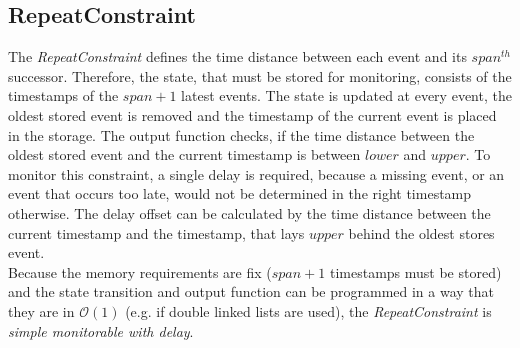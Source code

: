 \subsection{RepeatConstraint}
	The \emph{RepeatConstraint} defines the time distance between each event and its $span^{th}$ successor. Therefore, the state, that must be stored for monitoring, consists of the timestamps of the $span+1$ latest events. The state is updated at every event, the oldest stored event is removed and the timestamp of the current event is placed in the storage. The output function checks, if the time distance between the oldest stored event and the current timestamp is between $lower$ and $upper$. To monitor this constraint, a single delay is required, because a missing event, or an event that occurs too late, would not be determined in the right timestamp otherwise. The delay offset can be calculated by the time distance between the current timestamp and the timestamp, that lays $upper$ behind the oldest stores event.\\
	Because the memory requirements are fix ($span+1$ timestamps must be stored) and the state transition and output function can be programmed in a way that they are in  $\mathcal O(1)$ (e.g. if double linked lists are used), the \emph{RepeatConstraint} is \textit{simple monitorable with delay}.

